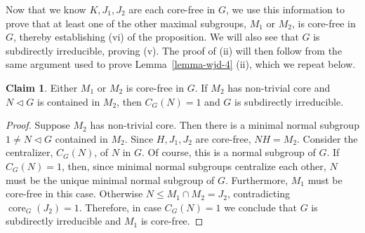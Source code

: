 \documentclass{gen-j-l}
\newcommand{\<}{\ensuremath{\langle}}
\renewcommand{\>}{\ensuremath{\rangle}}
\theoremstyle{plain}
\theoremstyle{definition}
\newcounter{claim}
\newtheorem{claim}[claim]{Claim}
\theoremstyle{remark}
\numberwithin{theorem}{section}
\numberwithin{claim}{section}
\numberwithin{equation}{section}
\numberwithin{conjecture}{section}
\renewcommand{\leq}{\ensuremath{\leqslant}}
\newcommand{\ssubnormal}{\ensuremath{\vartriangleleft}}
\newcommand{\core}{\ensuremath{\operatorname{core}}}
\newcommand{\2}{\ensuremath{\mathbf{2}}}
\newcommand{\3}{\ensuremath{\mathbf{3}}}
\begin{document}
Now that we know $K, J_1, J_2$ are each core-free in $G$, we use this
information to prove that at least one of the other maximal subgroups, 
$M_1$ or $M_2$, is core-free in $G$, thereby establishing (vi) of the proposition.  
We will also see that $G$ is subdirectly irreducible, proving (v).  The proof of
(ii) will then follow from the same argument used to prove 
Lemma~\ref{lemma-wjd-4} (ii), which we repeat below.

\begin{claim}
  Either $M_1$ or $M_2$ is core-free in $G$.  If $M_2$ has non-trivial core
  and $N\ssubnormal G$ is contained in $M_2$, then
  $C_G(N)=1$ and $G$ is subdirectly irreducible.
\end{claim}
\begin{proof}
  Suppose $M_2$ has non-trivial core.  Then there is 
a minimal normal subgroup $1\neq N \ssubnormal G$ 
  contained in $M_2$. %
  Since $H, J_1, J_2$ are core-free, $NH=M_2$.  Consider the centralizer,
  $C_G(N)$, of $N$ in $G$.  Of course, this is a normal subgroup 
  of $G$.
If $C_G(N) = 1$, then, since minimal normal subgroups
  centralize each other, $N$ must be the unique minimal normal subgroup of $G$.
  Furthermore, $M_1$ must be core-free in this case.  Otherwise 
  $N\leq M_1 \cap M_2 = J_2$, contradicting $\core_G(J_2)=1$. 
  Therefore, in case $C_G(N) = 1$ we 
  conclude that $G$ is subdirectly irreducible and $M_1$ is core-free.


\end{proof}
\end{document}

